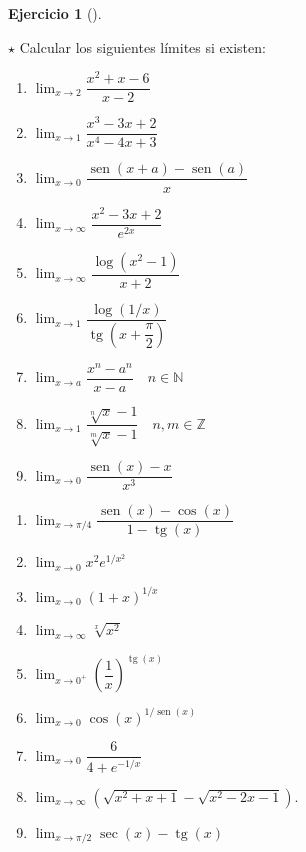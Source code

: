 \documentclass[
  a4paper,
]{scrreport}
\theoremstyle{definition}
\newtheorem{exercise}{Ejercicio}[chapter]
\theoremstyle{remark}
\begin{document}
\begin{exercise}[]\protect\hypertarget{exr-limites-1}{}\label{exr-limites-1}

\(\star\) Calcular los siguientes límites si existen:

\begin{enumerate}
\def\labelenumi{\alph{enumi}.}
\item
  \(\displaystyle \lim_{x\to 2} \dfrac{x^2+x-6}{x-2}\)
\item
  \(\displaystyle \lim_{x\to 1}\dfrac{x^3-3x+2}{x^4-4x+3}\)
\item
  \(\displaystyle \lim_{x\to 0}\dfrac{\operatorname{sen}(x+a)-\operatorname{sen}(a)}{x}\)
\item
  \(\displaystyle \lim_{x\to\infty}\dfrac{x^2-3x+2}{e^{2x}}\)
\item
  \(\displaystyle \lim_{x\to\infty}\dfrac{\log(x^2-1)}{x+2}\)
\item
  \(\displaystyle \lim_{x\to 1}\dfrac{\log(1/x)}{\operatorname{tg}(x+\dfrac{\pi}{2})}\)
\item
  \(\displaystyle \lim_{x\to a}\dfrac{x^n-a^n}{x-a}\quad n\in \mathbb{N}\)
\item
  \(\displaystyle \lim_{x\to 1}\dfrac{\sqrt[n]{x}-1}{\sqrt[m]{x}-1} \quad n,m \in \mathbb{Z}\)
\item
  \(\displaystyle \lim_{x\to 0}\dfrac{\operatorname{sen}(x)-x}{x^3}\)
\end{enumerate}

\begin{enumerate}
\def\labelenumi{\alph{enumi}.}
\setcounter{enumi}{9}
\item
  \(\displaystyle \lim_{x\to \pi/4}\dfrac{\operatorname{sen}(x)-\cos(x)}{1-\operatorname{tg}(x)}\)
\item
  \(\displaystyle \lim_{x\to 0}x^2e^{1/x^2}\)
\item
  \(\displaystyle \lim_{x\to 0}\left(1+x\right)^{1/x}\)
\item
  \(\displaystyle \lim_{x\to \infty} \sqrt[x]{x^2}\)
\item
  \(\displaystyle \lim_{x\to 0^+}\left(\dfrac{1}{x}\right)^{\operatorname{tg}(x)}\)
\item
  \(\displaystyle \lim_{x\to 0}\cos(x)^{1/\operatorname{sen}(x)}\)
\item
  \(\displaystyle \lim_{x\to 0}\dfrac{6}{4+e^{-1/x}}\)
\item
  \(\displaystyle \lim_{x\to \infty}\left(\sqrt{x^2+x+1}-\sqrt{x^2-2x-1}\right)\).
\item
  \(\displaystyle \lim_{x\to \pi/2}\sec(x)-\operatorname{tg}(x)\)
\end{enumerate}

\end{exercise}
\end{document}
